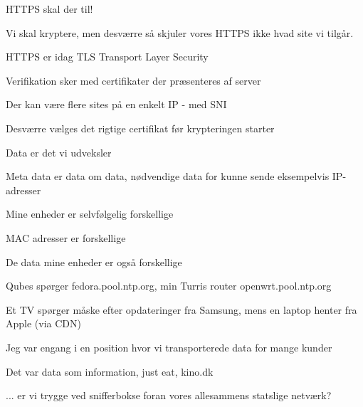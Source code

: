 \documentclass[18pt,landscape,a4paper,footrule]{foils}
\begin{document}

HTTPS skal der til!



Vi skal kryptere, men desværre så skjuler vores HTTPS ikke hvad site vi tilgår.

\begin{list2}
\item HTTPS er idag TLS Transport Layer Security
\item Verifikation sker med certifikater der præsenteres af server
\item Der kan være flere sites på en enkelt IP - med SNI
\item Desværre vælges det rigtige certifikat før krypteringen starter
\end{list2}





\begin{list2}
\item Data er det vi udveksler
\item Meta data er data om data, nødvendige data for kunne sende eksempelvis IP-adresser
\end{list2}



\begin{list2}
\item Mine enheder er selvfølgelig forskellige
\item MAC adresser er forskellige
\item De data mine enheder er også forskellige
\item Qubes spørger fedora.pool.ntp.org, min Turris router openwrt.pool.ntp.org
\item Et TV spørger måske efter opdateringer fra Samsung, mens en laptop henter fra Apple (via CDN)
\end{list2}



\begin{list2}
\item Jeg var engang i en position hvor vi transporterede data for mange kunder
\item Det var data som information, just eat, kino.dk
\item ... er vi trygge ved snifferbokse foran vores allesammens statslige netværk?
\end{list2}
\end{document}
